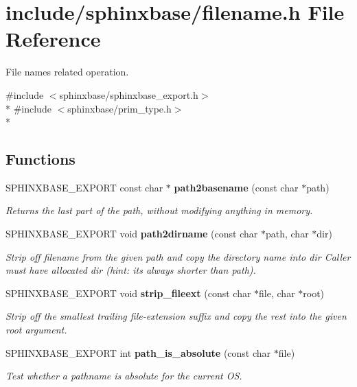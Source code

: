 \section{include/sphinxbase/filename.h File Reference}
\label{filename_8h}


File names related operation.  


{\ttfamily \#include $<$sphinxbase/sphinxbase\+\_\+export.\+h$>$}\\*
{\ttfamily \#include $<$sphinxbase/prim\+\_\+type.\+h$>$}\\*
\subsection*{Functions}
\begin{DoxyCompactItemize}
\item 
S\+P\+H\+I\+N\+X\+B\+A\+S\+E\+\_\+\+E\+X\+P\+O\+R\+T const char $\ast$ {\bf path2basename} (const char $\ast$path)\label{filename_8h_a532f0fe8616b8c447f82644c1cac7806}

\begin{DoxyCompactList}\small\item\em Returns the last part of the path, without modifying anything in memory. \end{DoxyCompactList}\item 
S\+P\+H\+I\+N\+X\+B\+A\+S\+E\+\_\+\+E\+X\+P\+O\+R\+T void {\bf path2dirname} (const char $\ast$path, char $\ast$dir)\label{filename_8h_a678be92ddb74695f26a9e4f527b073b0}

\begin{DoxyCompactList}\small\item\em Strip off filename from the given path and copy the directory name into dir Caller must have allocated dir (hint\+: it\textquotesingle{}s always shorter than path). \end{DoxyCompactList}\item 
S\+P\+H\+I\+N\+X\+B\+A\+S\+E\+\_\+\+E\+X\+P\+O\+R\+T void {\bf strip\+\_\+fileext} (const char $\ast$file, char $\ast$root)
\begin{DoxyCompactList}\small\item\em Strip off the smallest trailing file-\/extension suffix and copy the rest into the given root argument. \end{DoxyCompactList}\item 
S\+P\+H\+I\+N\+X\+B\+A\+S\+E\+\_\+\+E\+X\+P\+O\+R\+T int {\bf path\+\_\+is\+\_\+absolute} (const char $\ast$file)\label{filename_8h_ac59add2db73b33e81b354de114268e7a}

\begin{DoxyCompactList}\small\item\em Test whether a pathname is absolute for the current O\+S. \end{DoxyCompactList}\end{DoxyCompactItemize}


